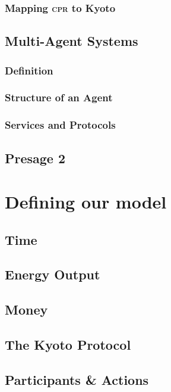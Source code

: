 \documentclass[]{article} %
\begin{document}
\subsubsection{Mapping \textsc{cpr} to Kyoto}

\subsection{Multi-Agent Systems}

\subsubsection{Definition}

\subsubsection{Structure of an Agent}

\subsubsection{Services and Protocols}

\subsection{Presage 2}

\section{Defining our model}

\subsection{Time}

\subsection{Energy Output}

\subsection{Money}

\subsection{The Kyoto Protocol}

\subsection{Participants \& Actions}
\end{document}
